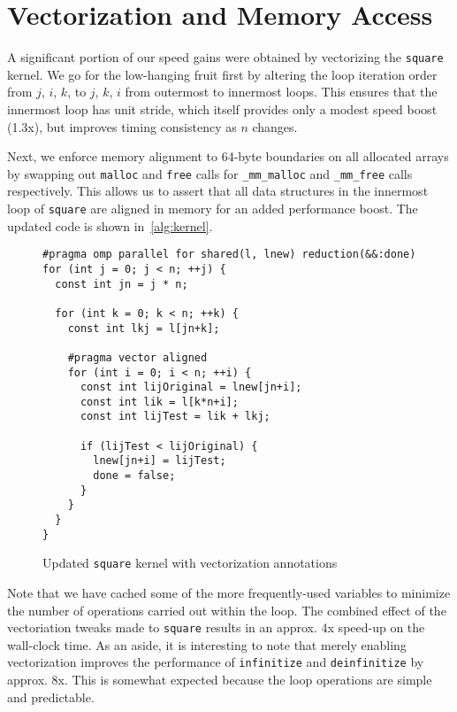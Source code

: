 \documentclass{scrartcl}
\begin{document}
  \section{Vectorization and Memory Access}
  A significant portion of our speed gains were obtained by vectorizing the \texttt{square} kernel. We go for the low-hanging fruit first by altering the loop iteration order from $j$, $i$, $k$, to $j$, $k$, $i$ from outermost to innermost loops. This ensures that the innermost loop has unit stride, which itself provides only a modest speed boost (1.3x), but improves timing consistency as $n$ changes.

  Next, we enforce memory alignment to 64-byte boundaries on all allocated arrays by swapping out \texttt{malloc} and \texttt{free} calls for \texttt{\_mm\_malloc} and \texttt{\_mm\_free} calls respectively. This allows us to assert that all data structures in the innermost loop of \texttt{square} are aligned in memory for an added performance boost. The updated code is shown in~\autoref{alg:kernel}.

  \begin{figure}[ht!]
    \begin{lstlisting}
#pragma omp parallel for shared(l, lnew) reduction(&&:done)
for (int j = 0; j < n; ++j) {
  const int jn = j * n;

  for (int k = 0; k < n; ++k) {
    const int lkj = l[jn+k];

    #pragma vector aligned
    for (int i = 0; i < n; ++i) {
      const int lijOriginal = lnew[jn+i];
      const int lik = l[k*n+i];
      const int lijTest = lik + lkj;

      if (lijTest < lijOriginal) {
        lnew[jn+i] = lijTest;
        done = false;
      }
    }
  }
}
    \end{lstlisting}
    \cprotect\caption{Updated \texttt{square} kernel with vectorization annotations\label{alg:kernel}}
  \end{figure}

  Note that we have cached some of the more frequently-used variables to minimize the number of operations carried out within the loop. The combined effect of the vectoriation tweaks made to \texttt{square} results in an approx. 4x speed-up on the wall-clock time. As an aside, it is interesting to note that merely enabling vectorization improves the performance of \texttt{infinitize} and \texttt{deinfinitize} by approx. 8x. This is somewhat expected because the loop operations are simple and predictable.
\end{document}
